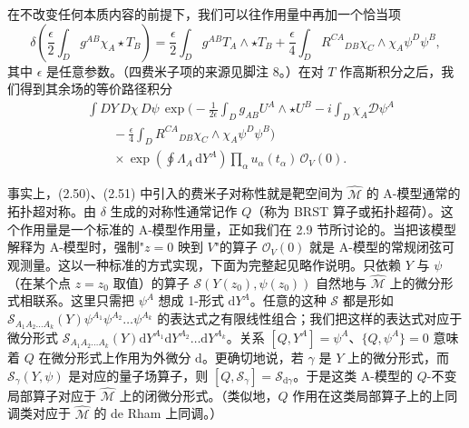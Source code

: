 \documentclass[11pt,a4paper,UTF8]{ctexart}
\theoremstyle{plain}
\theoremstyle{definition}
\begin{document}
在不改变任何本质内容的前提下，我们可以往作用量中再加一个恰当项
\begin{equation}
    \delta\left(\frac{\epsilon}{2}\int_D g^{AB}\chi_A\star T_B\right)=\frac{\epsilon}{2}\int_D g^{AB}T_A\wedge\star T_B+\frac{\epsilon}{4}\int_D R^{CA}{}_{DB}\chi_C\wedge\chi_A\psi^D\psi^B,
    \tag{2.53}
\end{equation}
其中 $\epsilon$ 是任意参数。（四费米子项的来源见脚注 8。）在对 $T$ 作高斯积分之后，我们得到其余场的等价路径积分
\begin{equation}
\begin{split}
    &\int DY\,D\chi\,D\psi\,\exp\biggl(-\frac{1}{2\epsilon}\int_D g_{AB}U^A\wedge\star U^B-i\int_D\chi_A\mathcal{D}\psi^A\\
    &\qquad-\frac{\epsilon}{4}\int_D R^{CA}{}_{DB}\chi_C\wedge\chi_A\psi^D\psi^B\biggr)\\
    &\qquad\times\exp\left(\oint\Lambda_A\,\mathrm{d}Y^A\right)\prod_\alpha u_\alpha(t_\alpha)\,\mathcal{O}_V(0).
\end{split}
    \tag{2.54}
\end{equation}


事实上，(2.50)、(2.51) 中引入的费米子对称性就是靶空间为 $\widehat{\mathcal{M}}$ 的 A-模型通常的拓扑超对称。由 $\delta$ 生成的对称性通常记作 $Q$（称为 BRST 算子或拓扑超荷）。这个作用量是一个标准的 A-模型作用量，正如我们在 2.9 节所讨论的。当把该模型解释为 A-模型时，强制"$z=0$ 映到 $V$"的算子 $\mathcal{O}_V(0)$ 就是 A-模型的常规闭弦可观测量。这以一种标准的方式实现，下面为完整起见略作说明。只依赖 $Y$ 与 $\psi$（在某个点 $z=z_0$ 取值）的算子 $\mathcal{S}(Y(z_0),\psi(z_0))$ 自然地与 $\widehat{\mathcal{M}}$ 上的微分形式相联系。这里只需把 $\psi^A$ 想成 1-形式 $\mathrm{d}Y^A$。任意的这种 $\mathcal{S}$ 都是形如 $\mathcal{S}_{A_1A_2\ldots A_k}(Y)\psi^{A_1}\psi^{A_2}\ldots\psi^{A_k}$ 的表达式之有限线性组合；我们把这样的表达式对应于微分形式 $\mathcal{S}_{A_1A_2\ldots A_k}(Y)\mathrm{d}Y^{A_1}\mathrm{d}Y^{A_2}\ldots\mathrm{d}Y^{A_k}$。关系 $[Q,Y^A]=\psi^A$、$\{Q,\psi^A\}=0$ 意味着 $Q$ 在微分形式上作用为外微分 $\mathrm{d}$。更确切地说，若 $\gamma$ 是 $Y$ 上的微分形式，而 $\mathcal{S}_\gamma(Y,\psi)$ 是对应的量子场算子，则 $[Q,\mathcal{S}_\gamma]=\mathcal{S}_{\mathrm{d}\gamma}$。于是这类 A-模型的 $Q$-不变局部算子对应于 $\widehat{\mathcal{M}}$ 上的闭微分形式。（类似地，$Q$ 作用在这类局部算子上的上同调类对应于 $\widehat{\mathcal{M}}$ 的 de Rham 上同调。）
\end{document}
